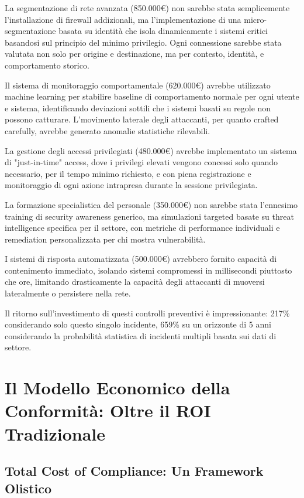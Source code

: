 La segmentazione di rete avanzata (850.000€) non sarebbe stata semplicemente l'installazione di firewall addizionali, ma l'implementazione di una micro-segmentazione basata su identità che isola dinamicamente i sistemi critici basandosi sul principio del minimo privilegio. Ogni connessione sarebbe stata valutata non solo per origine e destinazione, ma per contesto, identità, e comportamento storico.

Il sistema di monitoraggio comportamentale (620.000€) avrebbe utilizzato machine learning per stabilire baseline di comportamento normale per ogni utente e sistema, identificando deviazioni sottili che i sistemi basati su regole non possono catturare. L'movimento laterale degli attaccanti, per quanto crafted carefully, avrebbe generato anomalie statistiche rilevabili.

La gestione degli accessi privilegiati (480.000€) avrebbe implementato un sistema di "just-in-time" access, dove i privilegi elevati vengono concessi solo quando necessario, per il tempo minimo richiesto, e con piena registrazione e monitoraggio di ogni azione intrapresa durante la sessione privilegiata.

La formazione specialistica del personale (350.000€) non sarebbe stata l'ennesimo training di security awareness generico, ma simulazioni targeted basate su threat intelligence specifica per il settore, con metriche di performance individuali e remediation personalizzata per chi mostra vulnerabilità.

I sistemi di risposta automatizzata (500.000€) avrebbero fornito capacità di contenimento immediato, isolando sistemi compromessi in millisecondi piuttosto che ore, limitando drasticamente la capacità degli attaccanti di muoversi lateralmente o persistere nella rete.

Il ritorno sull'investimento di questi controlli preventivi è impressionante: 217\% considerando solo questo singolo incidente, 659\% su un orizzonte di 5 anni considerando la probabilità statistica di incidenti multipli basata sui dati di settore.

\section{Il Modello Economico della Conformità: Oltre il ROI Tradizionale}

\subsection{Total Cost of Compliance: Un Framework Olistico}

